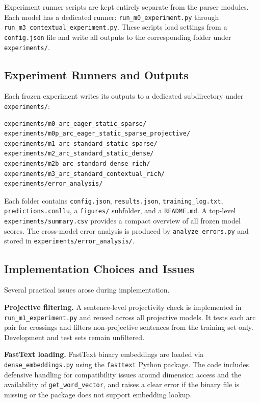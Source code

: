 \documentclass[12pt,letterpaper]{article}
\begin{document}
Experiment runner scripts are kept entirely separate from the parser modules. Each model has a dedicated runner: \texttt{run\_m0\_experiment.py} through \texttt{run\_m3\_contextual\_experiment.py}. These scripts load settings from a \texttt{config.json} file and write all outputs to the corresponding folder under \texttt{experiments/}.

\subsection{Experiment Runners and Outputs}
\label{subsec:experiment_outputs}

Each frozen experiment writes its outputs to a dedicated subdirectory under \texttt{experiments/}:

\begin{verbatim}
experiments/m0_arc_eager_static_sparse/
experiments/m0p_arc_eager_static_sparse_projective/
experiments/m1_arc_standard_static_sparse/
experiments/m2_arc_standard_static_dense/
experiments/m2b_arc_standard_dense_rich/
experiments/m3_arc_standard_contextual_rich/
experiments/error_analysis/
\end{verbatim}

Each folder contains \texttt{config.json}, \texttt{results.json}, \texttt{training\_log.txt}, \texttt{predictions.conllu}, a \texttt{figures/} subfolder, and a \texttt{README.md}. A top-level \texttt{experiments/summary.csv} provides a compact overview of all frozen model scores. The cross-model error analysis is produced by \texttt{analyze\_errors.py} and stored in \texttt{experiments/error\_analysis/}.

\subsection{Implementation Choices and Issues}
\label{subsec:implementation_issues}

Several practical issues arose during implementation.

\textbf{Projective filtering.} A sentence-level projectivity check is implemented in \newline  \texttt{run\_m1\_experiment.py} and reused across all projective models. It tests each arc pair for crossings and filters non-projective sentences from the training set only. Development and test sets remain unfiltered.

\textbf{FastText loading.} FastText binary embeddings are loaded via \texttt{dense\_embeddings.py} using the \texttt{fasttext} Python package. The code includes defensive handling for compatibility issues around dimension access and the availability of \texttt{get\_word\_vector}, and raises a clear error if the binary file is missing or the package does not support embedding lookup.
\end{document}
